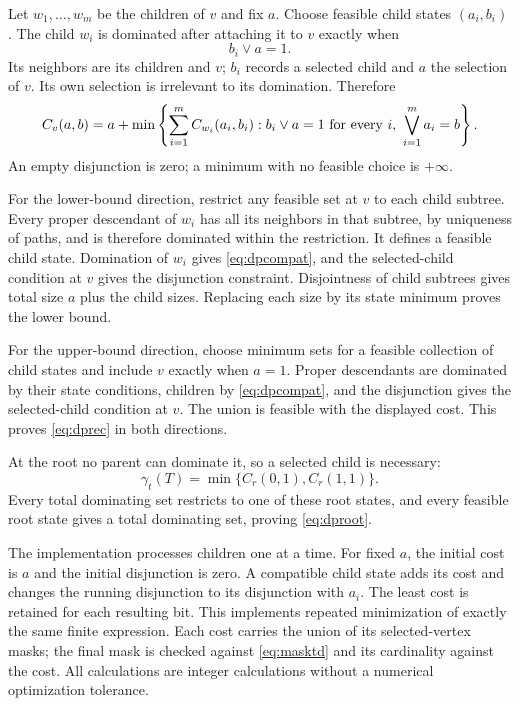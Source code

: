 \documentclass[11pt,a4paper]{article}
\theoremstyle{remark}
\newcommand{\td}{\gamma_t}
\newcommand{\OR}{\mathbin{\vee}}
\begin{document}
Let $w_1,\ldots,w_m$ be the children of $v$ and fix $a$.
Choose feasible child states $(a_i,b_i)$. The child $w_i$ is
dominated after attaching it to $v$ exactly when
\begin{equation}\label{eq:dpcompat}
 b_i\OR a=1.
\end{equation}
Its neighbors are its children and $v$; $b_i$ records a selected
child and $a$ the selection of $v$. Its own selection is irrelevant
to its domination. Therefore
\begin{equation}\label{eq:dprec}
 C_v(a,b)=a+
 \min\left\{
 \sum_{i=1}^{m}C_{w_i}(a_i,b_i):
 b_i\OR a=1\ \hbox{for every }i,\ 
 \bigvee_{i=1}^{m}a_i=b
 \right\}.
\end{equation}
An empty disjunction is zero; a minimum with no feasible choice
is $+\infty$.

For the lower-bound direction, restrict any feasible set at $v$
to each child subtree. Every proper descendant of $w_i$ has all
its neighbors in that subtree, by uniqueness of paths, and is
therefore dominated within the restriction. It defines a feasible
child state. Domination of $w_i$ gives \eqref{eq:dpcompat}, and
the selected-child condition at $v$ gives the disjunction constraint.
Disjointness of child subtrees gives total size $a$ plus the child
sizes. Replacing each size by its state minimum proves the lower bound.

For the upper-bound direction, choose minimum sets for a feasible
collection of child states and include $v$ exactly when $a=1$.
Proper descendants are dominated by their state conditions,
children by \eqref{eq:dpcompat}, and the disjunction gives the
selected-child condition at $v$. The union is feasible with the
displayed cost. This proves \eqref{eq:dprec} in both directions.

At the root no parent can dominate it, so a selected child is necessary:
\begin{equation}\label{eq:dproot}
 \td(T)=\min\{C_r(0,1),C_r(1,1)\}.
\end{equation}
Every total dominating set restricts to one of these root states,
and every feasible root state gives a total dominating set, proving
\eqref{eq:dproot}.

The implementation processes children one at a time.
For fixed $a$, the initial cost is $a$ and the initial disjunction is
zero. A compatible child state adds its cost and changes the
running disjunction to its disjunction with $a_i$.
The least cost is retained for each resulting bit. This implements
repeated minimization of exactly the same finite expression.
Each cost carries the union of its selected-vertex masks; the final
mask is checked against \eqref{eq:masktd} and its cardinality against
the cost. All calculations are integer calculations without a
numerical optimization tolerance.
\end{document}
